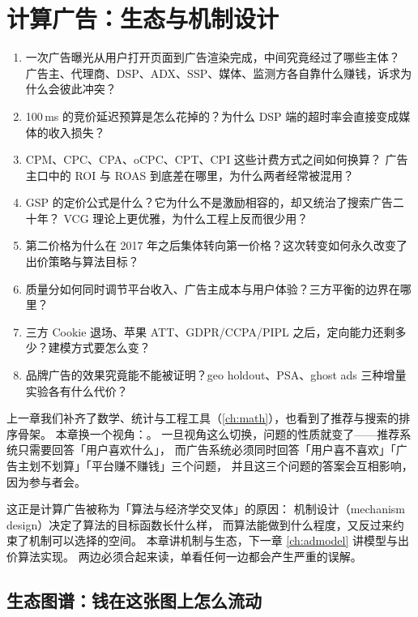 \chapter{计算广告：生态与机制设计}
\label{ch:ad}

\begin{insight}[本章要解决的问题]
\begin{enumerate}
  \item 一次广告曝光从用户打开页面到广告渲染完成，中间究竟经过了哪些主体？
        广告主、代理商、DSP、ADX、SSP、媒体、监测方各自靠什么赚钱，诉求为什么会彼此冲突？
  \item 100\,ms 的竞价延迟预算是怎么花掉的？为什么 DSP 端的超时率会直接变成媒体的收入损失？
  \item CPM、CPC、CPA、oCPC、CPT、CPI 这些计费方式之间如何换算？
        广告主口中的 ROI 与 ROAS 到底差在哪里，为什么两者经常被混用？
  \item GSP 的定价公式是什么？它为什么不是激励相容的，却又统治了搜索广告二十年？
        VCG 理论上更优雅，为什么工程上反而很少用？
  \item 第二价格为什么在 2017 年之后集体转向第一价格？这次转变如何永久改变了出价策略与算法目标？
  \item 质量分如何同时调节平台收入、广告主成本与用户体验？三方平衡的边界在哪里？
  \item 三方 Cookie 退场、苹果 ATT、GDPR/CCPA/PIPL 之后，定向能力还剩多少？建模方式要怎么变？
  \item 品牌广告的效果究竟能不能被证明？geo holdout、PSA、ghost ads 三种增量实验各有什么代价？
\end{enumerate}
\end{insight}

上一章我们补齐了数学、统计与工程工具（\cref{ch:math}），也看到了推荐与搜索的排序骨架。
本章换一个视角：。
一旦视角这么切换，问题的性质就变了——推荐系统只需要回答「用户喜欢什么」，
而广告系统必须同时回答「用户喜不喜欢」「广告主划不划算」「平台赚不赚钱」三个问题，
并且这三个问题的答案会互相影响，因为参与者会。

这正是计算广告被称为「算法与经济学交叉体」的原因：
机制设计（mechanism design）决定了算法的目标函数长什么样，
而算法能做到什么程度，又反过来约束了机制可以选择的空间。
本章讲机制与生态，下一章 \cref{ch:admodel} 讲模型与出价算法实现。
两边必须合起来读，单看任何一边都会产生严重的误解。

\section{生态图谱：钱在这张图上怎么流动}

